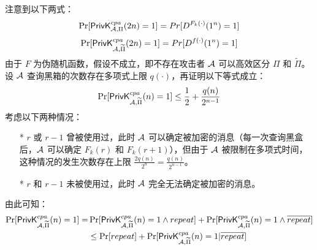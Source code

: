 \begin{questions}
\begin{solution}
\begin{enumerate}
                注意到以下两式：
                \begin{equation}
                    \begin{aligned}
                       \Pr[\mathsf{PrivK}^{cpa}_{\mathcal{A},\Pi}(2n)=1]=Pr[D^{F_k(\cdot)}(1^n)=1]
                    \end{aligned}
                \end{equation}
                \begin{equation}
                    \begin{aligned}
                       \Pr[\mathsf{PrivK}^{cpa}_{\mathcal{A},\widetilde{\Pi}}(2n)=1]=Pr[D^{f(\cdot)}(1^n)=1]
                    \end{aligned}
                \end{equation}
                由于 $F$ 为伪随机函数，假设不成立，即不存在攻击者 $\mathcal{A}$ 可以高效区分 $\Pi$ 和 $\widetilde{\Pi}$。设 $\mathcal{A}$ 查询黑箱的次数存在多项式上限 $q(\cdot)$，再证明以下等式成立：
                \begin{equation}
                    \label{equal-4}
                    \begin{aligned}
                       \Pr[\mathsf{PrivK}^{cpa}_{\mathcal{A},\widetilde{\Pi}}(n)=1]\leq\frac{1}{2}+\frac{q(n)}{2^{n-1}}
                    \end{aligned}
                \end{equation}
                考虑以下两种情况：
                \begin{enumerate}
                    \item[*] $r$ 或 $r-1$ 曾被使用过，此时 $\mathcal{A}$ 可以确定被加密的消息（每一次查询黑盒后，$\mathcal{A}$ 可以确定 $F_k(r)$ 和 $F_k(r + 1)$），但由于 $\mathcal{A}$ 被限制在多项式时间，这种情况的发生次数存在上限 $\frac{2q(n)}{2^n}=\frac{q(n)}{2^{n-1}}$。
                    \item[*] $r$ 和 $r-1$ 未被使用过，此时 $\mathcal{A}$ 完全无法确定被加密的消息。
                \end{enumerate}
                由此可知：
                \begin{equation}
                    \begin{aligned}
                       \Pr[\algo{PrivK}^{cpa}_{\AdvA,\widetilde{\Pi}}(n)=1]=&\Pr[\algo{PrivK}^{cpa}_{\AdvA,\widetilde{\Pi}}(n)=1\land{repeat}]+\Pr[\algo{PrivK}^{cpa}_{\AdvA,\widetilde{\Pi}}(n)=1\land\overline{repeat}]\\
                       &\leq\Pr[repeat]+\Pr[\algo{PrivK}^{cpa}_{\AdvA,\widetilde{\Pi}}(n)=1|\overline{repeat}]\\

\end{aligned}
\end{equation}
\end{enumerate}
\end{solution}
\end{questions}
